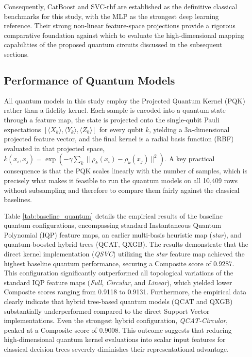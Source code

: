 \documentclass{ieeeaccess}
\begin{document}
Consequently, CatBoost and SVC-rbf are established as the definitive classical benchmarks for this study, with the MLP as the strongest deep learning reference. Their strong non-linear feature-space projections provide a rigorous comparative foundation against which to evaluate the high-dimensional mapping capabilities of the proposed quantum circuits discussed in the subsequent sections.

\subsection{Performance of Quantum Models}

All quantum models in this study employ the Projected Quantum Kernel (PQK) rather than a fidelity kernel. Each sample is encoded into a quantum state through a feature map, the state is projected onto the single-qubit Pauli expectations $[\langle X_k\rangle, \langle Y_k\rangle, \langle Z_k\rangle]$ for every qubit $k$, yielding a $3n$-dimensional projected feature vector, and the final kernel is a radial basis function (RBF) evaluated in that projected space, $k(x_i,x_j)=\exp(-\gamma\sum_k \lVert \rho_k(x_i)-\rho_k(x_j)\rVert^2)$. A key practical consequence is that the PQK scales linearly with the number of samples, which is precisely what makes it feasible to run the quantum models on all 10{,}409 rows without subsampling and therefore to compare them fairly against the classical baselines.

Table \ref{tab:baseline_quantum} details the empirical results of the baseline quantum configurations, encompassing standard Instantaneous Quantum Polynomial (IQP) feature maps, an earlier multi-basis heuristic map (\textit{star}), and quantum-boosted hybrid trees (QCAT, QXGB). The results demonstrate that the direct kernel implementation (\textit{QSVC}) utilizing the \textit{star} feature map achieved the highest baseline quantum performance, securing a Composite score of 0.9287. This configuration significantly outperformed all topological variations of the standard IQP feature maps (\textit{Full}, \textit{Circular}, and \textit{Linear}), which yielded lower Composite scores ranging from 0.9118 to 0.9131. Furthermore, the empirical data clearly indicate that hybrid tree-based quantum models (QCAT and QXGB) substantially underperformed compared to the direct Support Vector implementations. Even the strongest hybrid configuration, \textit{QCAT-Circular}, peaked at a Composite score of 0.9008. This outcome suggests that reducing high-dimensional quantum kernel evaluations into scalar input features for classical decision trees severely diminishes their representational advantage.
\end{document}
